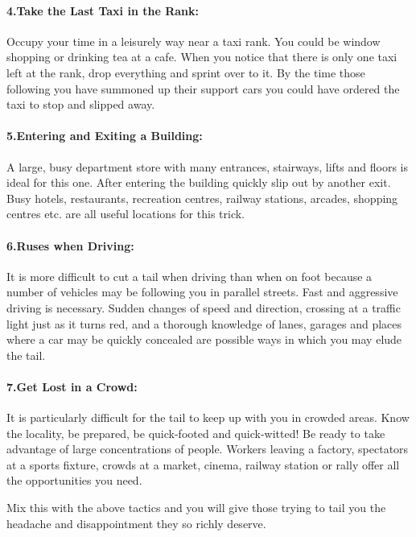 \paragraph{4.Take the Last Taxi in the Rank:}

Occupy your time in a leisurely way near a taxi rank. You could be
window shopping or drinking tea at a cafe. When you notice that there is
only one taxi left at the rank, drop everything and sprint over to it.
By the time those following you have summoned up their support cars you
could have ordered the taxi to stop and slipped away.

\paragraph{5.Entering and Exiting a Building:}

A large, busy department store with many entrances, stairways, lifts and
floors is ideal for this one. After entering the building quickly slip
out by another exit. Busy hotels, restaurants, recreation centres,
railway stations, arcades, shopping centres etc. are all useful
locations for this trick.

\paragraph{6.Ruses when Driving:}

It is more difficult to cut a tail when driving than when on foot
because a number of vehicles may be following you in parallel streets.
Fast and aggressive driving is necessary. Sudden changes of speed and
direction, crossing at a traffic light just as it turns red, and a
thorough knowledge of lanes, garages and places where a car may be
quickly concealed are possible ways in which you may elude the tail.

\paragraph{7.Get Lost in a Crowd:}

It is particularly difficult for the tail to keep up with you in crowded
areas. Know the locality, be prepared, be quick-footed and quick-witted!
Be ready to take advantage of large concentrations of people. Workers
leaving a factory, spectators at a sports fixture, crowds at a market,
cinema, railway station or rally offer all the opportunities you need.

Mix this with the above tactics and you will give those trying to tail
you the headache and disappointment they so richly deserve.

